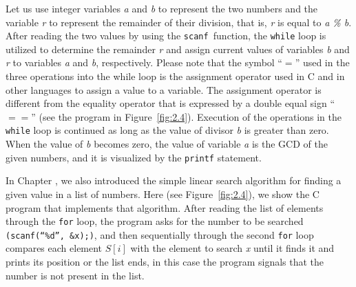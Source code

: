 Let us use integer variables \textit{a} and \textit{b} to represent the two numbers and the variable \textit{r} to represent the remainder of their division, that is, \textit{r} is equal to \textit{a \% b}. After reading the two values by using the \texttt{scanf }function, the \texttt{while} loop is utilized to determine the remainder \textit{r} and assign current values of variables \textit{b} and \textit{r} to variables \textit{a} and \textit{b}, respectively. Please note that the symbol ``$=$'' used in the three operations into the while loop is the assignment operator used in C and in other languages to assign a value to a variable. The assignment operator is different from the equality operator that is expressed by a double equal sign ``${=}{=}$'' (see the program in Figure~\ref{fig:2.4}). Execution of the operations in the \texttt{while} loop is continued as long as the value of divisor \textit{b} is greater than zero. When the value of \textit{b} becomes zero, the value of variable \textit{a} is the GCD of the given numbers, and it is visualized by the \texttt{printf} statement.

In Chapter , we also introduced the simple linear search algorithm for finding a given value in a list of numbers. Here (see Figure~\ref{fig:2.4}), we show the C program that implements that algorithm. After reading the list of elements through the \texttt{for} loop, the program asks for the number to be searched \texttt{(scanf(``\%d'', \&x);)}, and then sequentially through the second \texttt{for} loop compares each element $S[i]$ with the element to search \textit{x} until it finds it and prints its position or the list ends, in this case the program signals that the number is not present in the list.

